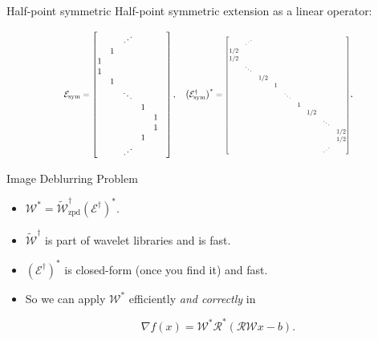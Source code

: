 \documentclass[xcolor=dvipsnames,t]{beamer} %
\newcommand\scalemath[2]{\scalebox{#1}{\mbox{\ensuremath{\displaystyle #2}}}}
\begin{document}
\begin{frame}{Half-point symmetric}
   Half-point symmetric extension as a linear operator:

\[ \scalemath{0.75}{\mathcal{E}_\text{sym} = \begin{bmatrix} & & \iddots & & &\\ & 1 &&&&\\ 1&&&&&\\1&&&&\\&1&&&&\\&&\ddots&&&\\&&&1&\\&&&&1\\&&&&1\\&&&1&\\&&\iddots&&\end{bmatrix}, \quad \left(\mathcal{E}_\text{sym}^\dagger\right)^\ast = \scalemath{0.75}{\begin{bmatrix} & \iddots \\ 1/2&&&&&\\1/2&&&&\\&\ddots&&&&&&\\&&1/2&\\&&&1\\&&&&\ddots\\&&&&&1\\&&&&&&1/2\\&&&&&&&\ddots\\&&&&&&&&1/2\\&&&&&&&&1/2\\&&&&&&&\iddots\\\end{bmatrix}}}. \]

\end{frame}

\begin{frame}{Image Deblurring Problem}
   \begin{itemize}
      \item $\mathcal{W}^\ast = \tilde{\mathcal{W}}_\text{zpd}^\dagger(\mathcal{E}^\dagger)^\ast$.
      \item $\tilde{\mathcal{W}}^\dagger$ is part of wavelet libraries and is fast.
      \item $(\mathcal{E}^\dagger)^\ast$ is closed-form (once you find it) and fast.
      \item So we can apply $\mathcal{W}^\ast$ efficiently \emph{and correctly} in

         \[ \nabla f(x) = \mathcal{W}^\ast\mathcal{R}^\ast\left(\mathcal{RW}x-b\right). \] 
   \end{itemize}
\end{frame}
\end{document}

